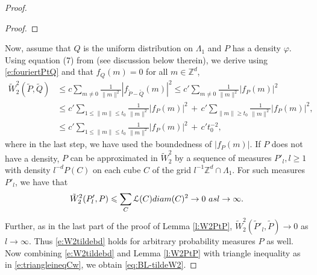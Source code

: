 \documentclass[12pt]{article}
\newtheorem{proposition}[theorem]{Proposition}
\newcommand{\Z}{\mathbb{Z}}
\newcommand{\Leb}{\mathcal{L}}
\newcommand{\1}{\mathbf{1}}
\newcommand{\REMOVE}[1]{}
\begin{document}
{{{{{\begin{proof}
\begin{proof}
\end{proof}
%
 {Now, assume that {$Q$ is the uniform distribution on $\Lambda_1$} and $P$ has a density $\varphi$. Using equation (7) from \cite{bobkov2021simple} (see discussion below therein), we derive using \eqref{e:fouriertPtQ} and that $f_Q(m) = 0$ for all $m \in \Z^d$,}
%
\begin{align}
\tilde W^2_{2}(\tilde P , \tilde Q ) & \leqslant  c\sum_{m\neq 0}\frac{ 1}{\|m\|^{2}} | f_{ \tilde P - \tilde Q }(m) | ^{2}  \leqslant  c'\sum_{m\neq 0}\frac{ 1}{\|m\|^{2}} | f_P(m) | ^{2} \nonumber \\
& \leqslant c' \sum_{1\leqslant  \|m\| \leqslant t_0}\frac{ 1}{\|m\|^{2}} | f_{P}(m) | ^{2} \, + \, c' \sum_{\|m\| \geqslant t_0}\frac{ 1}{\|m\|^{2}} | f_{P}(m) | ^{2}, \nonumber \\
\label{e:W2tildebd} & \leqslant c'\sum_{1\leqslant  \|m\| \leqslant t_0} \frac{ 1}{\|m\|^{2}} | f_{P}(m) | ^{2} \, + \, c' t_0^{-2},
\end{align}
%
{where in the last step, we have used the boundedness of $|f_P(m)|$.}
If $ P $ does not have a density, {$P$ can be approximated in $ \tilde W_{2}^{2}$ by a sequence of measures $P'_{l}, l \geq 1$ with density $l^{-d}P(C)$ on each cube $C$ of the grid $l^{-1}\mathbb{Z} ^{d}\cap \Lambda _{1}$. For such measures $P'_l$, we have that
%
$$ \tilde W_{2}^{2}(P'_{l},P)\leqslant \sum_{C}\Leb(C)  { \rm diam}(C)^{2}\to 0 \, \, \textrm{ as } l\to \infty.$$
%
Further, as in the last part of the proof of Lemma \ref{l:W2PtP}, $\tilde W_{2}^{2}(\tilde P'_{l},\tilde P) \to 0$ as $l \to \infty$. Thus \eqref{e:W2tildebd} holds for arbitrary probability measures $P$ as well.} \\

Now combining \eqref{e:W2tildebd} and Lemma \ref{l:W2PtP} with triangle inequality as in \eqref{e:triangleineqCw}, we obtain \eqref{eq:BL-tildeW2}.
\end{proof}
%
\REMOVE{{We now prove that our choices of cost functions are all continuity moduli. }
%

 {new version}

 \begin{proposition}
 Let $ w(x) = x^{ 1/2}(-\ln(x))^{ \gamma },\gamma >0$.
 \end{proposition}


\begin{proof}
$w''(x)\sim \frac{1}{4}x^{ -3/2}(-\ln(x))^{ -\gamma }<0$ for $ x$ sufficiently small, hence subadittive for $ x$ sufficiently small..
\end{proof}

}}}}}}
\end{document}
